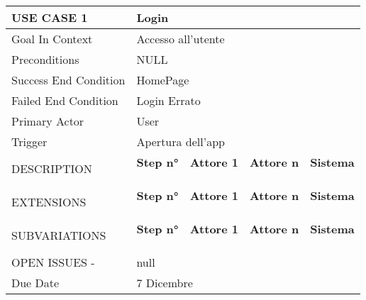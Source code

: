 \documentclass{article}
\begin{document}
\renewcommand\arraystretch{1.5}




\begin{tabular}{|l|l|l|l|l|}
\hline
    USE CASE 1 & \multicolumn{4}{l|}{Login}\\
    \hline
    Goal In Context & \multicolumn{4}{l|}{Accesso all'utente}\\
    \hline
    Preconditions & \multicolumn{4}{l|}{NULL} \\
    \hline
    Success End Condition & \multicolumn{4}{l|}{HomePage} \\
    \hline
    Failed End Condition & \multicolumn{4}{l|}{Login Errato} \\
    \hline
    Primary Actor & \multicolumn{4}{l|}{User} \\ 
    \hline
    Trigger & \multicolumn{4}{l|}{Apertura dell'app} \\
    \hline
    \multirow{4}{*}{DESCRIPTION} & \textbf{Step n°} &  \textbf{Attore 1} & \textbf{Attore n} &  \textbf{Sistema} \\
    \cline{2-5}
    & & & & \\
    \cline{2-5}
    & & & & \\
    \cline{2-5}
    & & & & \\
    \hline
    
     \multirow{4}{*}{EXTENSIONS} & \textbf{Step n°} &  \textbf{Attore 1} & \textbf{Attore n} &  \textbf{Sistema} \\
    \cline{2-5}
    & & & & \\
    \cline{2-5}
    & & & & \\
    \cline{2-5}
    & & & & \\
    \hline
    
     \multirow{4}{*}{SUBVARIATIONS} & \textbf{Step n°} &  \textbf{Attore 1} & \textbf{Attore n} &  \textbf{Sistema} \\
    \cline{2-5}
    & & & & \\
    \cline{2-5}
    & & & & \\
    \cline{2-5}
    & & & & \\
    \hline
    
    OPEN ISSUES - & \multicolumn{4}{l|}{null}\\
    \hline
    
    Due Date & \multicolumn{4}{l|}{7 Dicembre}\\
\hline
\end{tabular}
\end{document}
